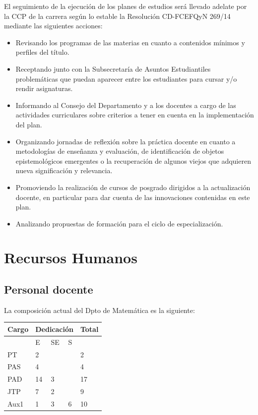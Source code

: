 \documentclass[a4paper, 12pt]{article}
\begin{document}
El seguimiento de la ejecución de los planes de estudios será llevado adelate por la CCP de la carrera según lo estable  la Resolución CD-FCEFQyN 269/14 mediante las siguientes acciones:

\begin{itemize}
 \item Revisando los programas de las materias en cuanto a contenidos mínimos y perfiles del título.
 \item Receptando junto con la Subsecretaría de Asuntos Estudiantiles problemáticas que puedan aparecer entre los estudiantes para cursar y/o rendir asignaturas.
 \item Informando al Consejo del Departamento y a los docentes a cargo de las actividades curriculares  sobre criterios a tener en cuenta en la implementación del plan.
 \item Organizando jornadas de reflexión sobre la práctica docente en cuanto a metodologías de enseñanza y evaluación, de identificación de objetos epistemológicos emergentes  o la recuperación de algunos viejos que adquieren nueva significación y relevancia.
 
 \item Promoviendo la realización de cursos de posgrado dirigidos a la actualización docente, en particular para dar cuenta de las innovaciones contenidas en este plan.
 
 \item Analizando propuestas de formación para el ciclo de especialización.
 
\end{itemize}


\section{Recursos Humanos}


\subsection{Personal docente}

La composición actual del Dpto de Matemática es la siguiente:

\begin{tabularx}{1\textwidth}{|l|l|l|l|l|} \hline  
 \rowcolor[gray]{.9}
 Cargo &\multicolumn{3}{|l|}{Dedicación} & Total\\ \hline
 \rowcolor[gray]{.9}
    &  E  &  SE  &  S &    \\ \hline  
PT & 2 & & & 2\\ \hline  
PAS & 4 & & & 4 \\ \hline
PAD & 14 & 3 & & 17 \\ \hline  
JTP & 7 & 2 & & 9\\ \hline  
Aux1 & 1 & 3 & 6 & 10 \\ \hline  
\end{tabularx}
\end{document}
